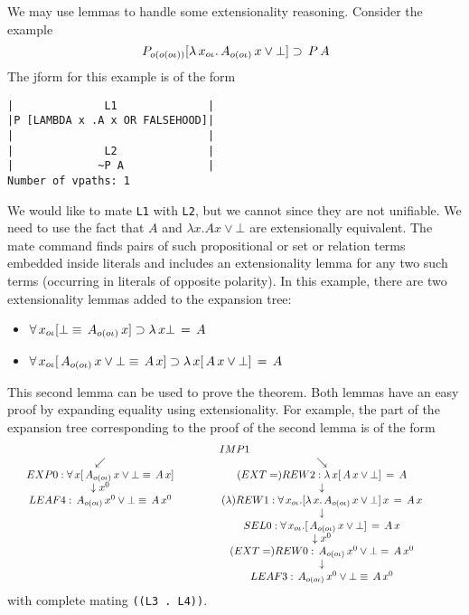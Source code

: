 We may use lemmas to handle some extensionality reasoning.
Consider the example 
$$ \,P_{\greeko(\greeko(\greeko\greeki))} [ \lambda \,x_{\greeko\greeki} . \,A_{\greeko(\greeko\greeki)} \,x \lor \bot ] \supset \,P \,A$$
The jform for this example is of the form
\begin{verbatim}
|              L1              |
|P [LAMBDA x .A x OR FALSEHOOD]|
|                              |
|              L2              |
|             ~P A             |
Number of vpaths: 1
\end{verbatim}
We would like to mate \verb+L1+ with \verb+L2+, but we cannot since
they are not unifiable.  We need to use the fact that $A$ and
$\lambda x . A x \lor \bot$ are extensionally equivalent.
The mate command  finds pairs
of such propositional or set or relation terms embedded inside
literals and includes an extensionality lemma for any two
such terms (occurring in literals of opposite polarity).
In this example, there are two extensionality lemmas
added to the expansion tree:
\begin{itemize}
\item $ \forall \,x_{\greeko\greeki} [ \bot \equiv \,A_{\greeko(\greeko\greeki)} \,x ] \supset \lambda \,x \bot \,= \,A$
\item $ \forall \,x_{\greeko\greeki} [ \,A_{\greeko(\greeko\greeki)} \,x \lor \bot \equiv \,A \,x ] \supset \lambda \,x [ \,A \,x \lor \bot ] \,= \,A$
\end{itemize}
This second lemma can be used to prove the theorem.
Both lemmas have an easy proof by expanding equality
using extensionality.  For example, the part of the expansion
tree corresponding to the proof of the second lemma is of the form
$$\eimp{1}{ \forall \,x_{\greeko\greeki} [ \,A_{\greeko(\greeko\greeki)} \,x \lor \bot \equiv \,A \,x ] \supset \lambda \,x [ \,A \,x \lor \bot ] \,= \,A}
{\uexpnode{0}{\forall \, x [\,A_{\greeko(\greeko\greeki)} \,x \lor \bot \equiv \,A \,x]}{x^0}
{\eleaf{4}{\,A_{\greeko(\greeko\greeki)} \,x^0 \lor \bot \equiv \,A \,x^0}}}
{\erew{2}{EXT=}{\lambda \,x [ \,A \,x \lor \bot ] \,= \,A}
{\erew{1}{\lambda}{\forall \,x_{\greeko\greeki} . [ \lambda \,x . \,A_{\greeko(\greeko\greeki)} \,x \lor \bot ] \,x \,= \,A \,x}
{\sel{0}{ \forall \,x_{\greeko\greeki} . [ \,A_{\greeko(\greeko\greeki)} \,x \lor \bot ] \,= \,A \,x}{x^0}
{\erew{0}{EXT=}{\,A_{\greeko(\greeko\greeki)} \,x^0 \lor \bot = \,A \,x^0}
{\eleaf{3}{\,A_{\greeko(\greeko\greeki)} \,x^0 \lor \bot \equiv \,A \,x^0}}}}}}
$$
with complete mating \verb+((L3 . L4))+.
